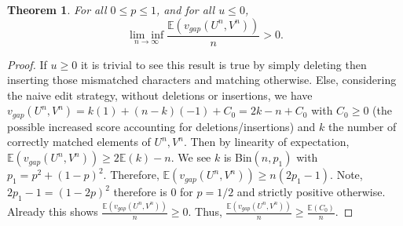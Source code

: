 \documentclass{article}
\newtheorem{theorem}{Theorem}[section]
\begin{document}
\begin{theorem}
For all $0 \leq p \leq 1$, and for all $u \leq 0$,
\begin{equation*}
\underset{n \to \infty}{\lim \inf} \frac{\mathbb{E}(v_{gap}(U^n,V^n))}{n}>0.
\end{equation*}
\end{theorem}
\vspace{-0.7cm}
\begin{proof}
If $u \geq 0$ it is trivial to see this result is true by simply deleting then inserting those mismatched characters and matching otherwise. Else, considering the naive edit strategy, without deletions or insertions, we have $v_{gap}(U^n,V^n) = k(1)+(n-k)(-1) + C_0= 2k-n + C_0$ with $C_0 \geq 0$ (the possible increased score accounting for deletions/insertions) and $k$ the number of correctly matched elements of $U^n,V^n$. Then by linearity of expectation, $\mathbb{E}(v_{gap}(U^n,V^n)) \geq 2\mathbb{E}(k)-n$. We see $k$ is Bin$(n,p_1)$ with $p_1=p^2+(1-p)^2$. Therefore, $\mathbb{E}(v_{gap}(U^n,V^n)) \geq n(2p_1-1)$. Note, $2p_1-1= (1-2p)^2$ therefore is 0 for $p=1/2$ and strictly positive otherwise. Already this shows $\frac{\mathbb{E} (v_{gap}(U^n,V^n))}{n} \geq 0$.  Thus, $\frac{\mathbb{E} (v_{gap}(U^n,V^n))}{n} \geq \frac{\mathbb{E}(C_0)}{n}$.


\end{proof}
\end{document}
